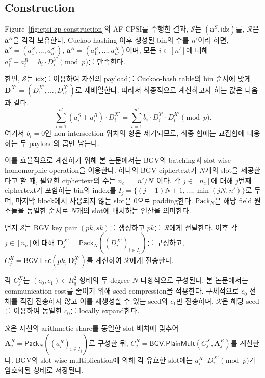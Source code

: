 \documentclass[sigconf,anonymous,review]{acmart}
\begin{document}
\subsection{Construction}\label{sec:pjc-construction}

Figure~\ref{fig:cpsi-zp-construction}의 AF-CPSI를 수행한 결과, $\mathcal{S}$는
$(\mathbf{a}^S,\mathsf{idx})$를, $\mathcal{R}$은
$\mathbf{a}^R$을 각각 보유한다.
Cuckoo hashing 이후 생성된 bin의 수를 $n'$이라 하면,
$\mathbf{a}^S=(a_1^S,\ldots,a_{n'}^S)$,
$\mathbf{a}^R=(a_1^R,\ldots,a_{n'}^R)$이며,
모든 $i\in[n']$에 대해
$a_i^S+a_i^R=b_i\cdot D_i^{Y'}\pmod p$를 만족한다.

한편, $\mathcal{S}$는 $\mathsf{idx}$를 이용하여 자신의 payload를
Cuckoo-hash table의 bin 순서에 맞게
$\mathbf{D}^{X'}=(D_1^{X'},\ldots,D_{n'}^{X'})$로 재배열한다.
따라서 최종적으로 계산하고자 하는 값은 다음과 같다.
\[
\sum_{i=1}^{n'}
(a_i^S+a_i^R)\cdot D_i^{X'}
=
\sum_{i=1}^{n'}
b_i\cdot D_i^{Y'}\cdot D_i^{X'}
\pmod p.
\]
여기서 $b_i=0$인 non-intersection 위치의 항은 제거되므로,
최종 합에는 교집합에 대응하는 두 payload의 곱만 남는다.

이를 효율적으로 계산하기 위해 본 논문에서는 BGV의 batching과
slot-wise homomorphic operation을 이용한다.
하나의 BGV ciphertext가 $N$개의 slot을 제공한다고 할 때,
필요한 ciphertext의 수는
$n_c=\lceil n'/N\rceil$이다.
각 $j\in[n_c]$에 대해 $j$번째 ciphertext가 포함하는 bin의 index를
$I_j=\{(j-1)N+1,\ldots,\min(jN,n')\}$로 두며,
마지막 block에서 사용되지 않는 slot은 $0$으로 padding한다.
$\mathsf{Pack}_N$은 해당 field 원소들을 동일한 순서로
$N$개의 slot에 배치하는 연산을 의미한다.

먼저 $\mathcal{S}$는 BGV key pair $(pk,sk)$를 생성하고
$pk$를 $\mathcal{R}$에게 전달한다.
이후 각 $j\in[n_c]$에 대해
$\mathbf{D}_j^{X'}
=\mathsf{Pack}_N((D_i^{X'})_{i\in I_j})$를 구성하고,
$C_j^X=\mathsf{BGV.Enc}(pk,\mathbf{D}_j^{X'})$를 계산하여
$\mathcal{R}$에게 전송한다.

각 $C_j^X$는 $(c_0,c_1)\in R_q^2$ 형태의 두 degree-$N$
다항식으로 구성된다.
본 논문에서는 communication cost를 줄이기 위해 seed compression을
적용한다.
구체적으로 $c_0$ 전체를 직접 전송하지 않고 이를 재생성할 수 있는
seed와 $c_1$만 전송하며, $\mathcal{R}$은 해당 seed를 이용하여
동일한 $c_0$를 locally expand한다.

$\mathcal{R}$은 자신의 arithmetic share를 동일한 slot 배치에 맞추어
$\mathbf{A}_j^R=\mathsf{Pack}_N((a_i^R)_{i\in I_j})$로 구성한 뒤,
$C_j^R=\mathsf{BGV.PlainMult}(C_j^X,\mathbf{A}_j^R)$를 계산한다.
BGV의 slot-wise multiplication에 의해 각 유효한 slot에는
$a_i^R\cdot D_i^{X'}\pmod p$가 암호화된 상태로 저장된다.
\end{document}
